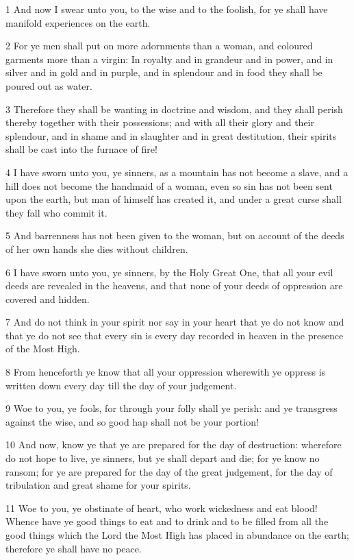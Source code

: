 \par 1 And now I swear unto you, to the wise and to the foolish, for ye shall have manifold experiences on the earth.
\par 2 For ye men shall put on more adornments than a woman, and coloured garments more than a virgin: In royalty and in grandeur and in power, and in silver and in gold and in purple, and in splendour and in food they shall be poured out as water.
\par 3 Therefore they shall be wanting in doctrine and wisdom, and they shall perish thereby together with their possessions; and with all their glory and their splendour, and in shame and in slaughter and in great destitution, their spirits shall be cast into the furnace of fire!
\par 4 I have sworn unto you, ye sinners, as a mountain has not become a slave, and a hill does not become the handmaid of a woman, even so sin has not been sent upon the earth, but man of himself has created it, and under a great curse shall they fall who commit it.
\par 5 And barrenness has not been given to the woman, but on account of the deeds of her own hands she dies without children.
\par 6 I have sworn unto you, ye sinners, by the Holy Great One, that all your evil deeds are revealed in the heavens, and that none of your deeds of oppression are covered and hidden.
\par 7 And do not think in your spirit nor say in your heart that ye do not know and that ye do not see that every sin is every day recorded in heaven in the presence of the Most High.
\par 8 From henceforth ye know that all your oppression wherewith ye oppress is written down every day till the day of your judgement.
\par 9 Woe to you, ye fools, for through your folly shall ye perish: and ye transgress against the wise, and so good hap shall not be your portion!
\par 10 And now, know ye that ye are prepared for the day of destruction: wherefore do not hope to live, ye sinners, but ye shall depart and die; for ye know no ransom; for ye are prepared for the day of the great judgement, for the day of tribulation and great shame for your spirits.
\par 11 Woe to you, ye obstinate of heart, who work wickedness and eat blood! Whence have ye good things to eat and to drink and to be filled from all the good things which the Lord the Most High has placed in abundance on the earth; therefore ye shall have no peace.
